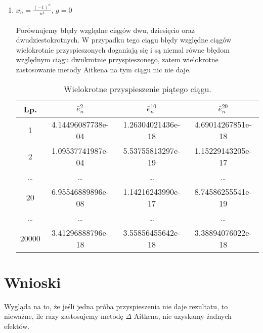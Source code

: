 \documentclass{article}
\begin{document}
\begin{enumerate}
\item $x_n = \frac{(-1)^n}{n^4}$, $g = 0$ \\ \\
Porównujemy błędy względne ciągów dwu, dziesięcio oraz dwudziestokrotnych.
W przypadku tego ciągu błędy względne ciągów wielokrotnie przyspieszonych doganiają się i są niemal równe błędom względnym ciągu dwukrotnie przyspieszonego, zatem wielokrotne zastosowanie metody Aitkena na tym ciągu nic nie daje.
\begin{table}[h]
\centering
\begin{tabular}[c]{|c|c|c|c|}
\hline
\textbf{Lp.} & $\bar{e}_n^{2}$ & $\bar{e}_n^{10}$ & $\bar{e}_n^{20}$\\
\hline
1 & 
4.14496087738e-04 &
1.26304021436e-18 &
4.69014267851e-18 \\
\hline
2 &
1.09537741987e-04 &
5.53755813297e-19 &
1.15229143205e-17 \\
\hline
\dots & \ldots & \ldots & \ldots \\
\hline
20 &
6.95546889896e-08 &
1.14216243990e-17 &
8.74586255541e-19 \\
\hline
\dots & \ldots & \ldots & \ldots \\
\hline
20000 &
3.41296888796e-18 &
3.55856455642e-18 &
3.38894076022e-18 \\
\hline
\end{tabular}
\caption{Wielokrotne przyspieszenie piątego ciągu.}
\end{table}
\end{enumerate}

\section{Wnioski}
Wygląda na to, że jeśli jedna próba przyspieszenia nie daje rezultatu, to nieważne, ile razy zastosujemy metodę $\Delta$ Aitkena, nie uzyskamy żadnych efektów.
\end{document}
